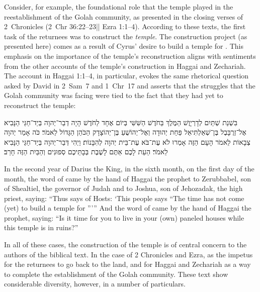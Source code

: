 Consider, for example, the foundational role that the temple played in the reestablishment of the Golah community, as presented in the closing verses of 2~Chronicles (2~Chr 36:22--23|| Ezra 1:1--4). According to these texts, the first task of the returnees was to construct the \emph{temple}. The construction project (as presented here) comes as a result of Cyrus' desire to build a temple for \yahweh. This emphasis on the importance of the temple's reconstruction aligns with sentiments from the other accounts of the temple's construction in Haggai and Zechariah. The account in Haggai 1:1--4, in particular, evokes the same rhetorical question asked by David in 2~Sam~7 and 1~Chr~17 and asserts that the struggles that the Golah community was facing were tied to the fact that they had yet to reconstruct the temple:
\begin{hebrewtext}
    ‏בִּשְׁנַת שְׁתַּיִם לְדָרְיָוֶשׁ הַמֶּלֶךְ בַּחֹדֶשׁ הַשִּׁשִּׁי בְּיוֹם אֶחָד לַחֹדֶשׁ הָיָה דְבַר־יְהוָה בְּיַד־חַגַּי הַנָּבִיא אֶל־זְרֻבָּבֶל בֶּן־שְׁאַלְתִּיאֵל פַּחַת יְהוּדָה וְאֶל־יְהוֹשֻׁעַ בֶּן־יְהוֹצָדָק הַכֹּהֵן הַגָּדוֹל לֵאמֹר׃ 
    כֹּה אָמַר יְהוָה צְבָאוֹת לֵאמֹר הָעָם הַזֶּה אָמְרוּ לֹא עֶת־בֹּא עֶת־בֵּית יְהוָה לְהִבָּנוֹת׃  
    וַיְהִי דְּבַר־יְהוָה בְּיַד־חַגַּי הַנָּבִיא לֵאמֹר׃ 
    הַעֵת לָכֶם אַתֶּם לָשֶׁבֶת בְּבָתֵּיכֶם סְפוּנִים וְהַבַּיִת הַזֶּה חָרֵב׃
\end{hebrewtext}
\begin{translation}
    In the second year of Darius the King, in the sixth month, on the first day of the month, the word of \yahweh came by the hand of Haggai the prophet to Zerubbabel, son of Shealtiel, the governor of Judah and to Joshua, son of Jehozadak, the high priest, saying: 
    ``Thus says \yahweh of Hosts: `This people says ``The time has not come (yet) to build a temple for \yahweh'''''
    And the word of \yahweh came by the hand of Haggai the prophet, saying:
    ``Is it time for you to live in your (own) paneled houses while this temple is in ruins?''
\end{translation}
\noindent
In all of these cases, the construction of the temple is of central concern to the authors of the biblical text. In the case of 2 Chronicles and Ezra, as the impetus for the returnees to go back to the land, and for Haggai and Zechariah as a way to complete the establishment of the Golah community. These text show considerable diversity, however, in a number of particulars. 

